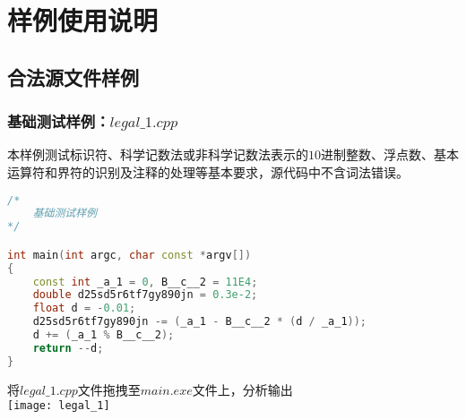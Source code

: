 \documentclass[UTF8]{ctexart}
\begin{document}
\section{样例使用说明}
\subsection{合法源文件样例}
\subsubsection{基础测试样例：$legal\_1.cpp$}
本样例测试标识符、科学记数法或非科学记数法表示的$10$进制整数、浮点数、基本运算符和界符的识别及注释的处理等基本要求，源代码中不含词法错误。
\begin{lstlisting}[language={C++}]
/*
    基础测试样例
*/

int main(int argc, char const *argv[])
{
    const int _a_1 = 0, B__c__2 = 11E4;
    double d25sd5r6tf7gy890jn = 0.3e-2;
    float d = -0.01;
    d25sd5r6tf7gy890jn -= (_a_1 - B__c__2 * (d / _a_1));
    d += (_a_1 % B__c__2);
    return --d;
}
\end{lstlisting}
将$legal\_1.cpp$文件拖拽至$main.exe$文件上，分析输出 \\
\texttt{[image: legal\_1]}
\end{document}
